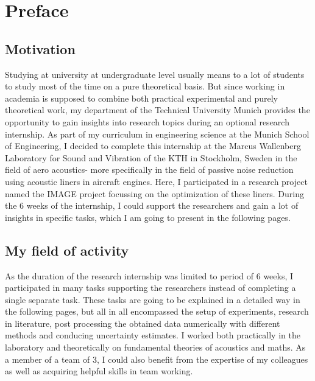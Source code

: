 \documentclass[11pt]{report} %
\begin{document}
\maketitle
{}
\newpage
{}

\setcounter{secnumdepth}{5}
\chapter{Preface}
\section{Motivation}
Studying at university at undergraduate level usually means to a lot of students to study most of the time on a pure theoretical basis.
But since working in academia is supposed to combine both practical experimental and purely theoretical work, my department of the Technical University Munich provides the opportunity to gain insights into research topics during an optional research internship.
As part of my curriculum in engineering science at the Munich School of Engineering, I decided to complete this internship at the Marcus Wallenberg Laboratory for Sound and Vibration of the KTH in Stockholm, Sweden in the field of aero acoustics-
more specifically in the field of passive noise reduction using acoustic liners in aircraft engines. Here, I participated in a research project named the IMAGE project focussing on the optimization of these liners. 
During the 6 weeks of the internship, I could support the researchers and gain a lot of insights in specific tasks, which I am going to present in the following pages. 

\section{My field of activity} 
As the duration of the research internship was limited to period of 6 weeks, I participated in many tasks supporting the researchers instead of completing a single separate task.
These tasks are going to be explained in a detailed way in the following pages, but all in all encompassed the setup of experiments, research in literature, post processing the obtained data numerically with different methods and conducing uncertainty estimates.
I worked both practically in the laboratory and theoretically on fundamental theories of acoustics and maths.
As a member of a team of 3, I could also benefit from the expertise of my colleagues as well as acquiring helpful skills in team working. 
\end{document}
